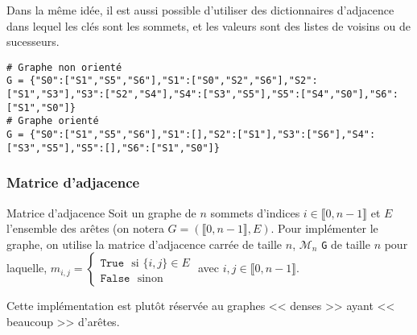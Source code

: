 Dans la même idée, il est aussi possible d'utiliser des dictionnaires d'adjacence dans lequel les clés sont les sommets, et les valeurs sont des listes de voisins ou de sucesseurs. 
\begin{lstlisting}
# Graphe non orienté 
G = {"S0":["S1","S5","S6"],"S1":["S0","S2","S6"],"S2":["S1","S3"],"S3":["S2","S4"],"S4":["S3","S5"],"S5":["S4","S0"],"S6":["S1","S0"]}
# Graphe orienté 
G = {"S0":["S1","S5","S6"],"S1":[],"S2":["S1"],"S3":["S6"],"S4":["S3","S5"],"S5":[],"S6":["S1","S0"]}
\end{lstlisting}


\subsubsection{Matrice d'adjacence}
\begin{defi}{Matrice d'adjacence}
Soit un graphe de $n$ sommets d'indices $i \in \llbracket 0, n-1\rrbracket$ et $E$ l'ensemble des arêtes 
(on notera $G=\left( \llbracket 0, n-1\rrbracket,E\right)$. Pour implémenter le graphe, on utilise la matrice d'adjacence carrée de taille $n$, $\mathcal{M}_n$ \texttt{G} de taille $n$ pour laquelle,
$m_{i,j}=\left\{
\begin{array}{l}
\texttt{True } \text{ si } \{i,j\}\in E\\
\texttt{False } \text{ sinon } 
\end{array}
\right.$ avec $i,j\in \llbracket 0, n-1\rrbracket$. 


\end{defi}
\begin{rem}
Cette implémentation est plutôt réservée au graphes << denses >> ayant << beaucoup >> d'arêtes.
\end{rem}


